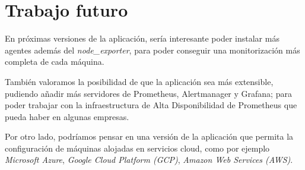 \section*{Trabajo futuro}

En próximas versiones de la aplicación, sería interesante poder instalar más agentes además del \textit{node\_exporter}, para poder conseguir una monitorización más completa de cada máquina. 

También valoramos la posibilidad de que la aplicación sea más extensible, pudiendo añadir más servidores de Prometheus, Alertmanager y Grafana; para poder trabajar con la infraestructura de Alta Disponibilidad de Prometheus que pueda haber en algunas empresas.

Por otro lado, podríamos pensar en una versión de la aplicación que permita la configuración de máquinas alojadas en servicios cloud, como por ejemplo \textit{Microsoft Azure}, \textit{Google Cloud Platform (GCP)}, \textit{Amazon Web Services (AWS)}.